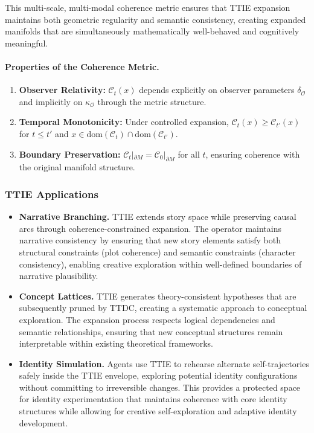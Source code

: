 This multi-scale, multi-modal coherence metric ensures that TTIE expansion maintains both geometric regularity and semantic consistency, creating expanded manifolds that are simultaneously mathematically well-behaved and cognitively meaningful.

\paragraph{Properties of the Coherence Metric.}
\begin{enumerate}
\item \textbf{Observer Relativity:} $\mathcal{C}_t(x)$ depends explicitly on observer parameters $\delta_{\mathcal{O}}$ and implicitly on $\kappa_{\mathcal{O}}$ through the metric structure.
\item \textbf{Temporal Monotonicity:} Under controlled expansion, $\mathcal{C}_t(x) \geq \mathcal{C}_{t'}(x)$ for $t \leq t'$ and $x \in \text{dom}(\mathcal{C}_t) \cap \text{dom}(\mathcal{C}_{t'})$.
\item \textbf{Boundary Preservation:} $\mathcal{C}_t|_{\partial M} = \mathcal{C}_0|_{\partial M}$ for all $t$, ensuring coherence with the original manifold structure.
\end{enumerate}

\subsubsection{TTIE Applications}
\label{subsec:bk4_ttie_applications}
\begin{itemize}
\item \textbf{Narrative Branching.} TTIE extends story space while preserving causal arcs through coherence-constrained expansion. The operator maintains narrative consistency by ensuring that new story elements satisfy both structural constraints (plot coherence) and semantic constraints (character consistency), enabling creative exploration within well-defined boundaries of narrative plausibility.

\item \textbf{Concept Lattices.} TTIE generates theory-consistent hypotheses that are subsequently pruned by TTDC, creating a systematic approach to conceptual exploration. The expansion process respects logical dependencies and semantic relationships, ensuring that new conceptual structures remain interpretable within existing theoretical frameworks.

\item \textbf{Identity Simulation.} Agents use TTIE to rehearse alternate self-trajectories safely inside the TTIE envelope, exploring potential identity configurations without committing to irreversible changes. This provides a protected space for identity experimentation that maintains coherence with core identity structures while allowing for creative self-exploration and adaptive identity development.
\end{itemize}

